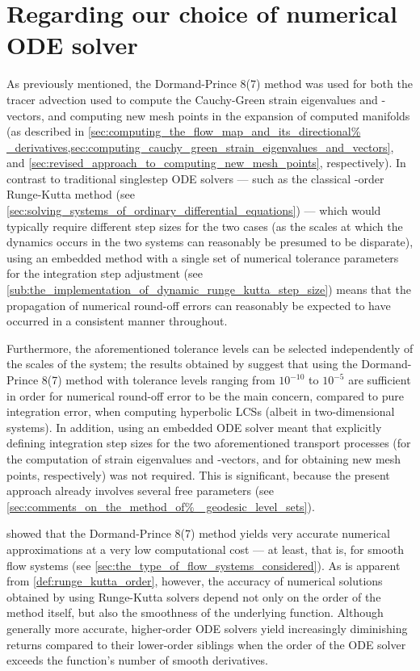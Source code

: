 \section{Regarding our choice of numerical ODE solver}
\label{sec:regarding_our_choice_of_numerical_ode_solver}

As previously mentioned, the Dormand-Prince 8(7) method was used for both the
tracer advection used to compute the Cauchy-Green strain eigenvalues and
-vectors, and computing new mesh points in the expansion of computed manifolds
(as described in \cref{sec:computing_the_flow_map_and_its_directional%
_derivatives,sec:computing_cauchy_green_strain_eigenvalues_and_vectors}, and
\cref{sec:revised_approach_to_computing_new_mesh_points}, respectively).
In contrast to traditional singlestep ODE solvers --- such as the classical
-order Runge-Kutta method (see
\cref{sec:solving_systems_of_ordinary_differential_equations}) --- which would
typically require different step sizes for the two cases (as the scales at which
the dynamics occurs in the two systems can reasonably be presumed to be
disparate), using an embedded method with a single set of numerical tolerance
parameters for the integration step adjustment (see
\cref{sub:the_implementation_of_dynamic_runge_kutta_step_size}) means that the
propagation of numerical round-off errors can reasonably be expected to have
occurred in a consistent manner throughout.

Furthermore, the aforementioned tolerance levels can be selected independently
of the scales of the system; the results obtained by
\textcite{loken2017sensitivity} suggest that using the Dormand-Prince 8(7)
method with tolerance levels ranging from $10^{-10}$ to $10^{-5}$ are
sufficient in order for numerical round-off error to be the main
concern, compared to pure integration error, when computing hyperbolic LCSs
(albeit in two-dimensional systems). In addition, using an embedded ODE
solver meant that explicitly defining integration step sizes for the
two aforementioned transport processes (for the computation of strain
eigenvalues and -vectors, and for obtaining new mesh points, respectively) was
not required. This is significant, because the present approach already
involves several free parameters (see \cref{sec:comments_on_the_method_of%
_geodesic_level_sets}).

\textcite{loken2017sensitivity} showed that the Dormand-Prince 8(7) method
yields very accurate numerical approximations at a very low computational cost
--- at least, that is, for smooth flow systems (see
\cref{sec:the_type_of_flow_systems_considered}). As is apparent from
\cref{def:runge_kutta_order}, however, the accuracy of numerical solutions
obtained by using Runge-Kutta solvers depend not only on the order of the
method itself, but also the smoothness of the underlying function. Although
generally more accurate, higher-order ODE solvers yield increasingly
diminishing  returns compared to their lower-order siblings when the order of
the ODE solver exceeds the function's number of smooth derivatives.

